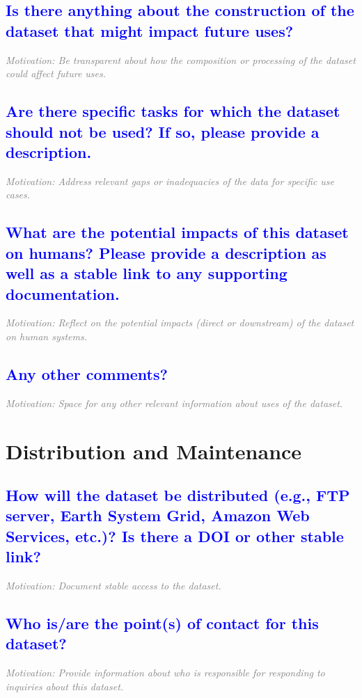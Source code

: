 \documentclass[letterpaper, 10 pt, transmag]{IEEEtran}
\begin{document}
\textcolor{blue}{\subsection{Is there anything about the construction of the dataset that might impact future uses?}}
\textcolor{gray}{\textit{Motivation: Be transparent about how the composition or processing of the dataset could affect future uses.}}

\textcolor{blue}{\subsection{Are there specific tasks for which the dataset should not be used? If so,
please provide a description.}}
\textcolor{gray}{\textit{Motivation: Address relevant gaps or inadequacies of the data for specific use cases.}}

\textcolor{blue}{\subsection{What are the potential impacts of this dataset on humans? Please provide a description as well as a stable link to any supporting documentation.}}
\textcolor{gray}{\textit{Motivation: Reflect on the potential impacts (direct or downstream) of the dataset on human systems.}}

\textcolor{blue}{\subsection{Any other comments?}}
\textcolor{gray}{\textit{Motivation: Space for any other relevant information about uses of the dataset.}}  
\vspace{10mm}

\section{Distribution and Maintenance}

\textcolor{blue}{\subsection{How will the dataset be distributed (e.g., FTP server, Earth System Grid, Amazon Web Services, etc.)? Is there a DOI or other stable link?}}
\textcolor{gray}{\textit{Motivation: Document stable access to the dataset.}}

\textcolor{blue}{\subsection{Who is/are the point(s) of contact for this dataset?}}
\textcolor{gray}{\textit{Motivation: Provide information about who is responsible for responding to inquiries about this dataset.}}
\end{document}
